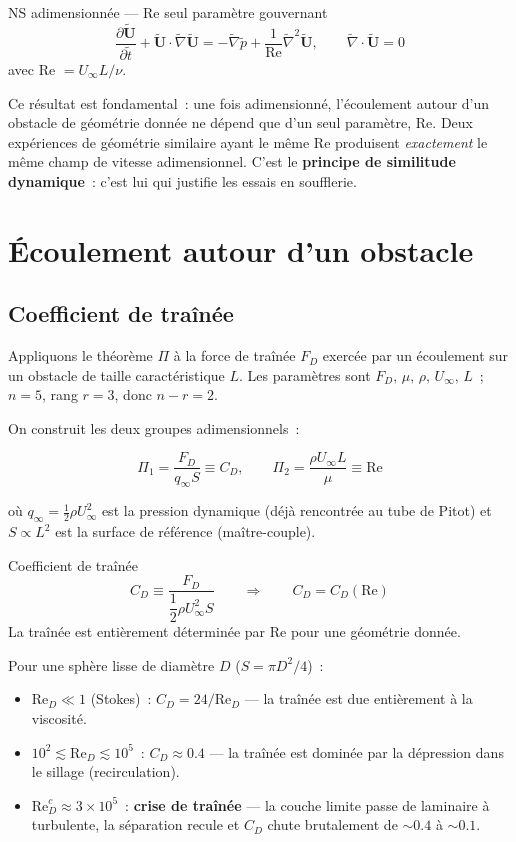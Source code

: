 \documentclass[11pt,a4paper]{report}
\begin{document}
\begin{importantbox}{NS adimensionnée --- Re seul paramètre gouvernant}
\[
    \frac{\partial \tilde{\bm{U}}}{\partial \tilde{t}}
    + \tilde{\bm{U}}\cdot\tilde{\nabla}\tilde{\bm{U}}
    = -\tilde{\nabla}\tilde{p}
    + \frac{1}{\mathrm{Re}}\tilde{\nabla}^2\tilde{\bm{U}},
    \qquad \tilde{\nabla}\cdot\tilde{\bm{U}} = 0
\]
avec Re $= U_\infty L/\nu$.
\end{importantbox}

Ce résultat est fondamental~: une fois adimensionné, l'écoulement autour d'un
obstacle de géométrie donnée ne dépend que d'un seul paramètre, Re.
Deux expériences de géométrie similaire ayant le même Re produisent
\emph{exactement} le même champ de vitesse adimensionnel.
C'est le \textbf{principe de similitude dynamique}~: c'est lui qui justifie
les essais en soufflerie.

\section{Écoulement autour d'un obstacle}

\subsection{Coefficient de traînée}

Appliquons le théorème $\Pi$ à la force de traînée $F_D$ exercée par un
écoulement sur un obstacle de taille caractéristique $L$. Les paramètres
sont $F_D,\,\mu,\,\rho,\,U_\infty,\,L$~; $n=5$, rang $r=3$, donc $n-r=2$.

On construit les deux groupes adimensionnels~:

\[
    \Pi_1 = \frac{F_D}{q_\infty S} \equiv C_D,
    \qquad
    \Pi_2 = \frac{\rho U_\infty L}{\mu} \equiv \mathrm{Re}
\]

où $q_\infty = \frac{1}{2}\rho U_\infty^2$ est la pression dynamique
(déjà rencontrée au tube de Pitot) et $S \propto L^2$ est la surface
de référence (maître-couple).

\begin{defbox}{Coefficient de traînée}
\[
    C_D \equiv \frac{F_D}{\dfrac{1}{2}\rho U_\infty^2 S}
    \qquad \Longrightarrow \qquad
    C_D = C_D(\mathrm{Re})
\]
La traînée est entièrement déterminée par Re pour une géométrie donnée.
\end{defbox}

Pour une sphère lisse de diamètre $D$ ($S=\pi D^2/4$)~:
\begin{itemize}
    \item $\mathrm{Re}_D \ll 1$ (Stokes)~: $C_D = 24/\mathrm{Re}_D$ --- la traînée
    est due entièrement à la viscosité.
    \item $10^2 \lesssim \mathrm{Re}_D \lesssim 10^5$~: $C_D \approx 0.4$ --- la traînée
    est dominée par la dépression dans le sillage (recirculation).
    \item $\mathrm{Re}_D^c \approx 3\times10^5$~: \textbf{crise de traînée} --- la couche
    limite passe de laminaire à turbulente, la séparation recule et $C_D$ chute
    brutalement de $\sim0.4$ à $\sim0.1$.
\end{itemize}
\end{document}
